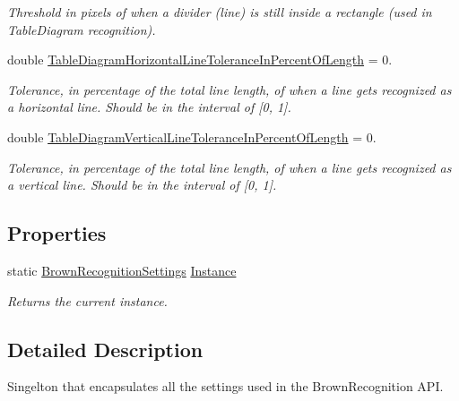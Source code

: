 \begin{DoxyCompactItemize}
\begin{DoxyCompactList}\small\item\em \-Threshold in pixels of when a divider (line) is still inside a rectangle (used in \-Table\-Diagram recognition). \end{DoxyCompactList}\item 
double \hyperlink{class_brown_recognition_common_1_1_brown_recognition_settings_adac31ced9ed90b1f404bcf6a4a8340b0}{\-Table\-Diagram\-Horizontal\-Line\-Tolerance\-In\-Percent\-Of\-Length} = 0.
\begin{DoxyCompactList}\small\item\em \-Tolerance, in percentage of the total line length, of when a line gets recognized as a horizontal line. \-Should be in the interval of \mbox{[}0, 1\mbox{]}. \end{DoxyCompactList}\item 
double \hyperlink{class_brown_recognition_common_1_1_brown_recognition_settings_af48d8590132bda5c1a512ee5d59927bf}{\-Table\-Diagram\-Vertical\-Line\-Tolerance\-In\-Percent\-Of\-Length} = 0.
\begin{DoxyCompactList}\small\item\em \-Tolerance, in percentage of the total line length, of when a line gets recognized as a vertical line. \-Should be in the interval of \mbox{[}0, 1\mbox{]}. \end{DoxyCompactList}\end{DoxyCompactItemize}
\subsection*{\-Properties}
\begin{DoxyCompactItemize}
\item 
static \hyperlink{class_brown_recognition_common_1_1_brown_recognition_settings}{\-Brown\-Recognition\-Settings} \hyperlink{class_brown_recognition_common_1_1_brown_recognition_settings_a86b3f25a8b13cce61cb05a1f51b0feaa}{\-Instance}
\begin{DoxyCompactList}\small\item\em \-Returns the current instance. \end{DoxyCompactList}\end{DoxyCompactItemize}


\subsection{\-Detailed \-Description}
\-Singelton that encapsulates all the settings used in the \-Brown\-Recognition \-A\-P\-I. 




